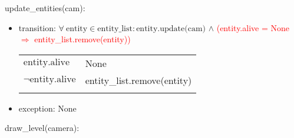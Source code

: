 \documentclass[12pt]{article}
\begin{document}
update\_entities(cam): 
\begin{itemize}
    \item transition: $\forall\ \text{entity} \in \text{entity\_list} : \text{entity.update(cam)}$ $\land$ \textcolor{red}{(entity.alive = None $\Rightarrow$ entity\_list.remove(entity))}\\
\begin{tabular}{|p{3cm}|l|}
\hhline{|-|-|}
\st{$\mbox{entity.alive}$} & None\\
\hhline{|-|-|}
\st{$\lnot \mbox{entity.alive}$} & entity\_list.remove(entity)\\
\hhline{|-|-|}
\end{tabular}
    \item exception: None
\end{itemize}

draw\_level(camera):
\end{document}
